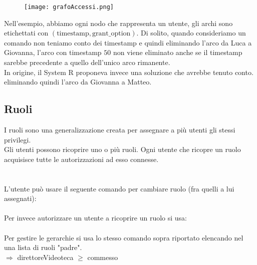 \begin{figure}[h]
    \centering
    \texttt{[image: grafoAccessi.png]}
    \label{fig:grafo}
\end{figure}

\noindent Nell'esempio, abbiamo ogni nodo che rappresenta un utente, gli archi sono etichettati con $(\text{timestamp}, \text{grant\_option})$. Di solito, quando consideriamo un comando  non teniamo conto dei timestamp e quindi eliminando l'arco da Luca a Giovanna, l'arco con timestamp $50$ non viene eliminato anche se il timestamp sarebbe precedente a quello dell'unico arco rimanente.\\
In origine, il System R proponeva invece una soluzione che avrebbe tenuto conto. eliminando quindi l'arco da Giovanna a Matteo.

\subsection{Ruoli}
I ruoli sono una generalizzazione creata per assegnare a più utenti gli stessi privilegi.\\
Gli utenti possono ricoprire uno o più ruoli. Ogni utente che ricopre un ruolo acquisisce tutte le autorizzazioni ad esso connesse.\vspace{2mm} \\
\\
\vspace{2mm} \\
L'utente può usare il seguente comando per cambiare ruolo (fra quelli a lui assegnati):\vspace{2mm} \\
\vspace{2mm} \\
Per invece autorizzare un utente a ricoprire un ruolo si usa:\vspace{2mm} \\
\vspace{2mm} \\
Per gestire le gerarchie si usa lo stesso comando sopra riportato elencando nel  una lista di ruoli "padre".\vspace{2mm} \\
 $\Rightarrow$ direttoreVideoteca $\geq$ commesso